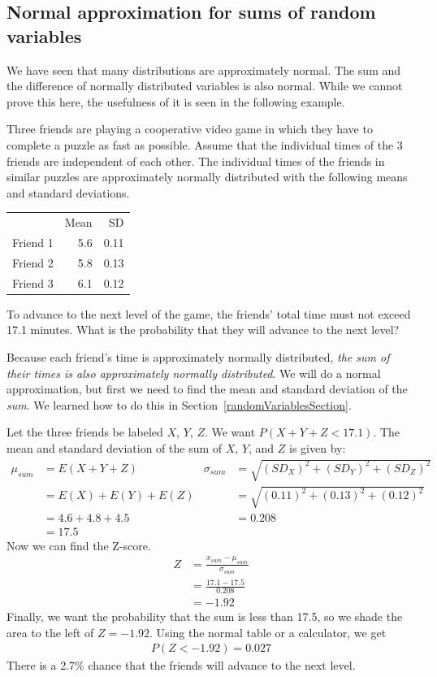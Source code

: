 \subsection{Normal approximation for sums of random variables}
\label{normapproxsumrv}

We have seen that many distributions are approximately normal. The sum and the difference of normally distributed variables is also normal. While we cannot prove this here, the usefulness of it is seen in the following example.

\begin{examplewrap}
\begin{nexample}{Three friends are playing a cooperative video game in which they have to complete a puzzle as fast as possible. Assume that the individual times of the 3 friends are independent of each other. The individual times of the friends in similar puzzles are approximately normally distributed with the following means and standard deviations. 
\begin{center}
\begin{tabular}{lrr}
& Mean &  SD \\
Friend 1 	& 5.6 & 0.11  \\
Friend 2 	& 5.8  & 0.13 \\
Friend 3 	& 6.1  & 0.12  
\end{tabular}
\end{center}
To advance to the next level of the game, the friends' total time must not exceed 17.1 minutes. What is the probability that they will advance to the next level?}
Because each friend's time is approximately normally distributed, \emph{the sum of their times is also approximately normally distributed}. We will do a normal approximation, but first we need to find the mean and standard deviation of the \emph{sum}. We learned how to do this in Section~\ref{randomVariablesSection}.

Let the three friends be labeled $X$, $Y$, $Z$. We want $P(X + Y + Z < 17.1)$. The mean and standard deviation of the sum of $X$, $Y$, and $Z$ is given by:
\begin{align*}
\mu_{sum} &= E(X+Y+Z)
	& \sigma_{sum}&= \sqrt{(SD_X)^2+(SD_Y)^2 + (SD_Z)^2} \\
&= E(X) + E(Y) + E(Z)
	& &= \sqrt{(0.11)^2+(0.13)^2+(0.12)^2}\\
&=4.6+4.8+4.5
	& &= 0.208 \\
&=17.5
\end{align*}
Now we can find the Z-score. 
\begin{align*}
Z &= \frac{x_{sum}-\mu_{sum}}{\sigma_{sum}} \\
&=\frac{17.1-17.5}{0.208} \\
&=-1.92
\end{align*}
Finally, we want the probability that the sum is less than 17.5, so we shade the area to the left of $Z = -1.92$. Using the normal table or a calculator, we get
\begin{align*}
P(Z < -1.92) = 0.027
\end{align*}
There is a 2.7\% chance that the friends will advance to the next level.
\end{nexample}
\end{examplewrap}

